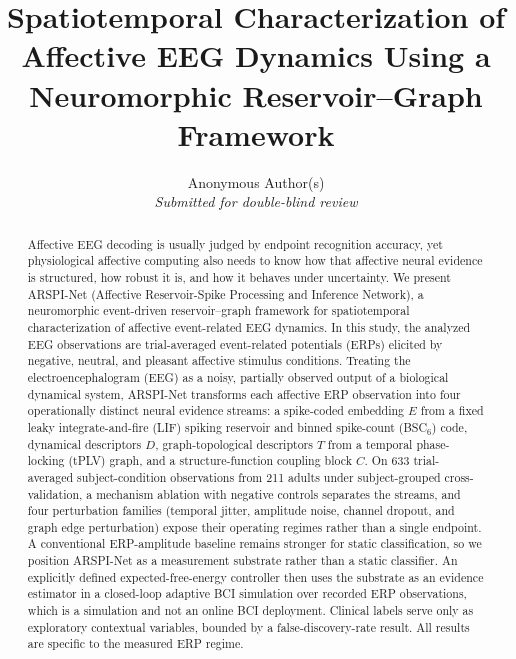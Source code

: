 \documentclass[journal]{IEEEtran}
\begin{document}
\title{Spatiotemporal Characterization of Affective EEG Dynamics Using a Neuromorphic Reservoir--Graph Framework}

\author{Anonymous Author(s)\\\textit{Submitted for double-blind review}}

\maketitle

\begin{abstract}
Affective EEG decoding is usually judged by endpoint recognition accuracy, yet physiological affective computing also needs to know how that affective neural evidence is structured, how robust it is, and how it behaves under uncertainty. We present ARSPI-Net (Affective Reservoir-Spike Processing and Inference Network), a neuromorphic event-driven reservoir--graph framework for spatiotemporal characterization of affective event-related EEG dynamics. In this study, the analyzed EEG observations are trial-averaged event-related potentials (ERPs) elicited by negative, neutral, and pleasant affective stimulus conditions. Treating the electroencephalogram (EEG) as a noisy, partially observed output of a biological dynamical system, ARSPI-Net transforms each affective ERP observation into four operationally distinct neural evidence streams: a spike-coded embedding $E$ from a fixed leaky integrate-and-fire (LIF) spiking reservoir and binned spike-count (BSC$_6$) code, dynamical descriptors $D$, graph-topological descriptors $T$ from a temporal phase-locking (tPLV) graph, and a structure-function coupling block $C$. On 633 trial-averaged subject-condition observations from 211 adults under subject-grouped cross-validation, a mechanism ablation with negative controls separates the streams, and four perturbation families (temporal jitter, amplitude noise, channel dropout, and graph edge perturbation) expose their operating regimes rather than a single endpoint. A conventional ERP-amplitude baseline remains stronger for static classification, so we position ARSPI-Net as a measurement substrate rather than a static classifier. An explicitly defined expected-free-energy controller then uses the substrate as an evidence estimator in a closed-loop adaptive BCI simulation over recorded ERP observations, which is a simulation and not an online BCI deployment. Clinical labels serve only as exploratory contextual variables, bounded by a false-discovery-rate result. All results are specific to the measured ERP regime.
\end{abstract}
\end{document}
